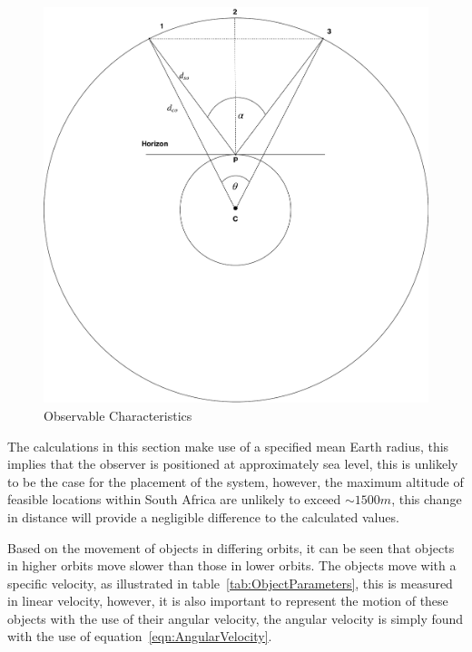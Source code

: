 \documentclass[11pt]{witseiepaper}
\begin{document}
\begin{center}
    \begin{figure}
        \includegraphics[width=\textwidth]{ObservableCharacteristics.pdf}
        \caption{Observable Characteristics}
        \label{fig:ObservableCharacteristics}    
    \end{figure}
\end{center}
The calculations in this section make use of a specified mean Earth radius, this implies that the observer is positioned at approximately sea level, this is unlikely to be the case for the placement of the system, however, the maximum altitude of feasible locations within South Africa are unlikely to exceed $\sim 1500 m$, this change in distance will provide a negligible difference to the calculated values.


Based on the movement of objects in differing orbits, it can be seen that objects in higher orbits move slower than those in lower orbits.
The objects move with a specific velocity, as illustrated in table~\ref{tab:ObjectParameters}, this is measured in linear velocity, however, it is also important to represent the motion of these objects with the use of their angular velocity, the angular velocity is simply found with the use of equation~\ref{eqn:AngularVelocity}.
\end{document}
